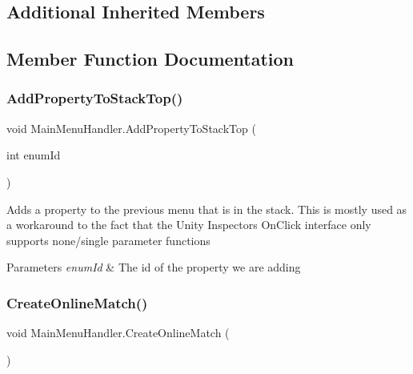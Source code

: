 \subsection*{Additional Inherited Members}


\subsection{Member Function Documentation}
\hypertarget{class_main_menu_handler_a47d8fcef1366d4c7f4979bea63dcb95f}{}\label{class_main_menu_handler_a47d8fcef1366d4c7f4979bea63dcb95f} 
\subsubsection{\texorpdfstring{Add\+Property\+To\+Stack\+Top()}{AddPropertyToStackTop()}}
{\footnotesize\ttfamily void Main\+Menu\+Handler.\+Add\+Property\+To\+Stack\+Top (\begin{DoxyParamCaption}\item[{int}]{enum\+Id }\end{DoxyParamCaption})}



Adds a property to the previous menu that is in the stack. This is mostly used as a workaround to the fact that the Unity Inspector\textquotesingle{}s On\+Click interface only supports none/single parameter functions 


\begin{DoxyParams}{Parameters}
{\em enum\+Id} & The id of the property we are adding\\
\hline
\end{DoxyParams}
\hypertarget{class_main_menu_handler_adf1c89669b528be6a27f7ac9f7fb0696}{}\label{class_main_menu_handler_adf1c89669b528be6a27f7ac9f7fb0696} 
\subsubsection{\texorpdfstring{Create\+Online\+Match()}{CreateOnlineMatch()}}
{\footnotesize\ttfamily void Main\+Menu\+Handler.\+Create\+Online\+Match (\begin{DoxyParamCaption}{ }\end{DoxyParamCaption})}



